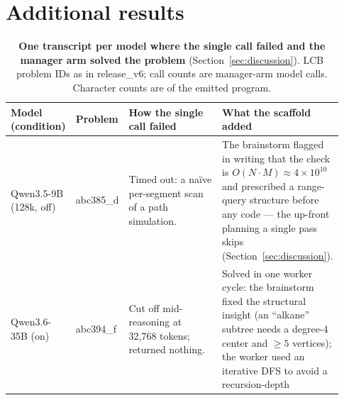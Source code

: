 \documentclass{article}
\begin{document}


\section{Additional results}
\label{app:results}







\begin{table}[p]
\centering
\caption{\textbf{One transcript per model where the single call failed and the manager arm solved
the problem} (Section~\ref{sec:discussion}). LCB problem IDs as in release\_v6; call counts are
manager-arm model calls. Character counts are of the emitted program.}
\label{tab:transcripts}
\footnotesize
\setlength{\tabcolsep}{4pt}
\setlength{\defaultaddspace}{2.5pt}
\begin{tabular}{@{}p{0.155\linewidth}p{0.101\linewidth}p{0.310\linewidth}p{0.364\linewidth}@{}}
\toprule
\textbf{Model} \newline \textbf{(condition)} & \textbf{Problem} & \textbf{How the single call failed} &
\textbf{What the scaffold added} \\
\midrule
Qwen3.5-9B \newline (128k, off) & abc385\_d & Timed out: a na\"ive per-segment scan of a path
simulation. & The brainstorm flagged in writing that the check is $O(N\cdot M) \approx
4\times10^{10}$ and prescribed a range-query structure before any code --- the up-front
planning a single pass skips (Section~\ref{sec:discussion}). \\
\addlinespace
Qwen3.6-35B \newline (on) & abc394\_f & Cut off mid-reasoning at 32,768 tokens; returned nothing. &
Solved in one worker cycle: the brainstorm fixed the structural insight (an ``alkane'' subtree needs
a degree-4 center and $\ge 5$ vertices); the worker used an iterative DFS to avoid a recursion-depth

\end{tabular}
\end{table}
\end{document}
